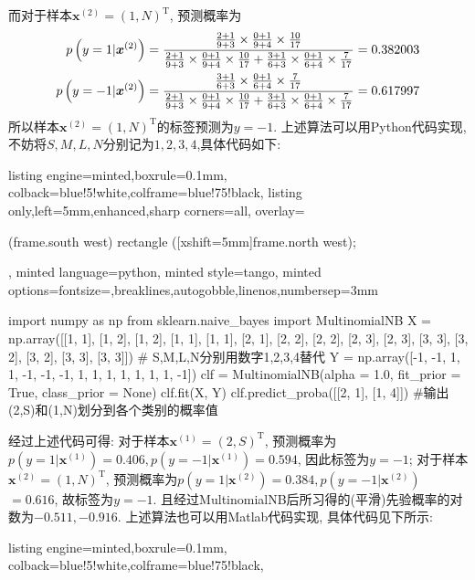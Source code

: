 \documentclass{article}
\begin{document}
\begin{homeworkProblem}
	而对于样本$\boldsymbol{x}^{(2)}=(1,N)^{\text{T}}$, 预测概率为
	\begin{align}
		p\left( y=1|\boldsymbol{x}^{\left( 2 \right)} \right) &=\frac{\frac{2+1}{9+3}\times \frac{0+1}{9+4}\times \frac{10}{17}}{\frac{2+1}{9+3}\times \frac{0+1}{9+4}\times \frac{10}{17}+\frac{3+1}{6+3}\times \frac{0+1}{6+4}\times \frac{7}{17}}=0.382003 \notag
		\\
		p\left( y=-1|\boldsymbol{x}^{\left( 2 \right)} \right) &=\frac{\frac{3+1}{6+3}\times \frac{0+1}{6+4}\times \frac{7}{17}}{\frac{2+1}{9+3}\times \frac{0+1}{9+4}\times \frac{10}{17}+\frac{3+1}{6+3}\times \frac{0+1}{6+4}\times \frac{7}{17}}=0.617997 \notag
	\end{align}
	所以样本$\boldsymbol{x}^{(2)}=(1,N)^{\text{T}}$的标签预测为$y=-1$.
	上述算法可以用Python代码实现, 不妨将$S,M,L,N$分别记为$1,2,3,4$,具体代码如下:
\begin{tcblisting}{listing engine=minted,boxrule=0.1mm,
colback=blue!5!white,colframe=blue!75!black,
listing only,left=5mm,enhanced,sharp corners=all,
overlay={\begin{tcbclipinterior} (frame.south west)
rectangle ([xshift=5mm]frame.north west);\end{tcbclipinterior}},
minted language=python,
minted style=tango,
minted options={fontsize=\normalsize,breaklines,autogobble,linenos,numbersep=3mm}}
import numpy as np  
from sklearn.naive_bayes import MultinomialNB
X = np.array([[1, 1], [1, 2], [1, 2], [1, 1], [1, 1], [2, 1], [2, 2], [2, 2],
             [2, 3], [2, 3], [3, 3], [3, 2], [3, 2], [3, 3], [3, 3]])
# S,M,L,N分别用数字1,2,3,4替代
Y = np.array([-1, -1, 1, 1, -1, -1, -1, 1, 1, 1, 1, 1, 1, 1, -1])  
clf = MultinomialNB(alpha = 1.0, fit_prior = True, class_prior = None)
clf.fit(X, Y)   
clf.predict_proba([[2, 1], [1, 4]]) #输出(2,S)和(1,N)划分到各个类别的概率值
\end{tcblisting}
	经过上述代码可得: 对于样本$\boldsymbol{x}^{(1)}=(2,S)^{\text{T}}$, 预测概率为$p\left( y=1|\boldsymbol{x}^{\left( 1 \right)} \right)=0.406,p\left( y=-1|\boldsymbol{x}^{\left( 1 \right)} \right)=0.594$, 因此标签为$y=-1$; 对于样本$\boldsymbol{x}^{(2)}=(1,N)^{\text{T}}$, 预测概率为$p\left( y=1|\boldsymbol{x}^{\left( 2 \right)} \right)=0.384,p\left( y=-1|\boldsymbol{x}^{\left( 2 \right)} \right)$
	$=0.616$, 故标签为$y=-1$. 且经过MultinomialNB后所习得的(平滑)先验概率的对数为$-0.511, -0.916$.
	\newpage
	上述算法也可以用Matlab代码实现, 具体代码见下所示:
\begin{tcblisting}{listing engine=minted,boxrule=0.1mm,
colback=blue!5!white,colframe=blue!75!black,
}
\end{tcblisting}
\end{homeworkProblem}
\end{document}
